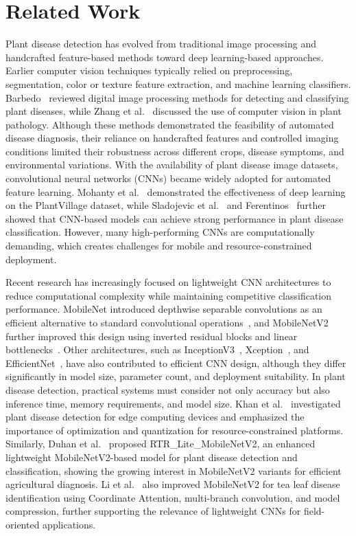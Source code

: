 \section{Related Work}

Plant disease detection has evolved from traditional image processing and handcrafted feature-based methods toward deep learning-based approaches. Earlier computer vision techniques typically relied on preprocessing, segmentation, color or texture feature extraction, and machine learning classifiers. Barbedo~\cite{barbedo2013} reviewed digital image processing methods for detecting and classifying plant diseases, while Zhang et al.~\cite{zhang2014} discussed the use of computer vision in plant pathology. Although these methods demonstrated the feasibility of automated disease diagnosis, their reliance on handcrafted features and controlled imaging conditions limited their robustness across different crops, disease symptoms, and environmental variations. With the availability of plant disease image datasets, convolutional neural networks (CNNs) became widely adopted for automated feature learning. Mohanty et al.~\cite{mohanty2016} demonstrated the effectiveness of deep learning on the PlantVillage dataset, while Sladojevic et al.~\cite{sladojevic2016} and Ferentinos~\cite{ferentinos2018} further showed that CNN-based models can achieve strong performance in plant disease classification. However, many high-performing CNNs are computationally demanding, which creates challenges for mobile and resource-constrained deployment.

Recent research has increasingly focused on lightweight CNN architectures to reduce computational complexity while maintaining competitive classification performance. MobileNet introduced depthwise separable convolutions as an efficient alternative to standard convolutional operations~\cite{howard2017mobilenets}, and MobileNetV2 further improved this design using inverted residual blocks and linear bottlenecks~\cite{sandler2018mobilenetv2}. Other architectures, such as InceptionV3~\cite{szegedy2016rethinking}, Xception~\cite{chollet2017xception}, and EfficientNet~\cite{tan2019efficientnet}, have also contributed to efficient CNN design, although they differ significantly in model size, parameter count, and deployment suitability. In plant disease detection, practical systems must consider not only accuracy but also inference time, memory requirements, and model size. Khan et al.~\cite{khan2023edge} investigated plant disease detection for edge computing devices and emphasized the importance of optimization and quantization for resource-constrained platforms. Similarly, Duhan et al.~\cite{duhan2025rtr} proposed RTR\_Lite\_MobileNetV2, an enhanced lightweight MobileNetV2-based model for plant disease detection and classification, showing the growing interest in MobileNetV2 variants for efficient agricultural diagnosis. Li et al.~\cite{li2024tea_mobilenetv2} also improved MobileNetV2 for tea leaf disease identification using Coordinate Attention, multi-branch convolution, and model compression, further supporting the relevance of lightweight CNNs for field-oriented applications.

